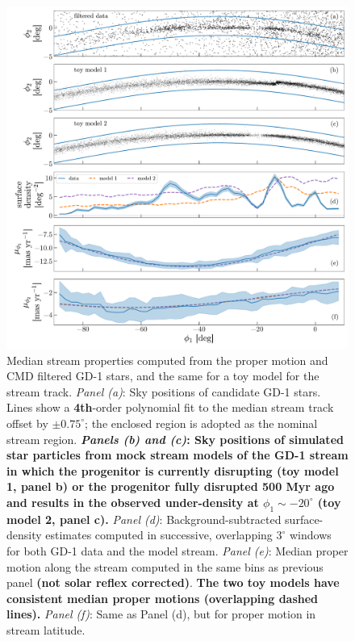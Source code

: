 \documentclass[modern]{aastex62}
\newcommand{\changes}[1]{{\textbf{#1}}}
\begin{document}
\begin{figure}
\begin{center}
\includegraphics[width=\textwidth]{track_observables.pdf}
\end{center}
\caption{%
Median stream properties computed from the proper motion and CMD filtered GD-1
stars, and the same for a toy model for the stream track.
\textit{Panel (a)}: Sky positions of candidate GD-1 stars.
Lines show a \changes{4th}-order polynomial fit to the median stream track offset by $\pm 0.75^\circ$; the enclosed region is adopted as the nominal stream region.
\changes{\textit{Panels (b) and (c)}: Sky positions of simulated star particles from mock stream models of the GD-1 stream in which the progenitor is currently disrupting (toy model 1, panel b) or the progenitor fully disrupted 500 Myr ago and results in the observed under-density at $\phi_1 \sim -20^\circ$ (toy model 2, panel c).}
\textit{Panel (d)}: Background-subtracted surface-density estimates computed in
successive, overlapping $3^\circ$ windows for both GD-1 data and the model
stream.
\textit{Panel (e)}: Median proper motion along the stream computed in the same
bins as previous panel \changes{(not solar reflex corrected)}.
\changes{The two toy models have consistent median proper motions (overlapping dashed lines).}
\textit{Panel (f)}: Same as Panel (d), but for proper motion in stream latitude.
}
\label{fig:track-and-model}
\end{figure}
\end{document}

